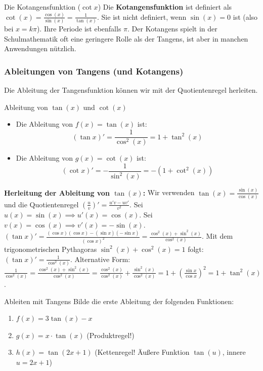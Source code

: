 \begin{infoboxumgebung}{Die Kotangensfunktion ($\cot x$)}
Die \textbf{Kotangensfunktion} ist definiert als $\cot(x) = \frac{\cos(x)}{\sin(x)} = \frac{1}{\tan(x)}$.
Sie ist nicht definiert, wenn $\sin(x)=0$ ist (also bei $x=k\pi$). Ihre Periode ist ebenfalls $\pi$.
Der Kotangens spielt in der Schulmathematik oft eine geringere Rolle als der Tangens, ist aber in manchen Anwendungen nützlich.
\end{infoboxumgebung}

\subsubsection{Ableitungen von Tangens (und Kotangens)}
Die Ableitung der Tangensfunktion können wir mit der Quotientenregel herleiten.

\begin{merksatzumgebung}{Ableitung von $\tan(x)$ und $\cot(x)$}
\begin{itemize}
    \item Die Ableitung von $f(x) = \tan(x)$ ist:
    \[ (\tan x)' = \frac{1}{\cos^2(x)} = 1 + \tan^2(x) \]
    \item Die Ableitung von $g(x) = \cot(x)$ ist:
    \[ (\cot x)' = -\frac{1}{\sin^2(x)} = -(1 + \cot^2(x)) \]
\end{itemize}
\end{merksatzumgebung}

\textbf{Herleitung der Ableitung von $\tan(x)$:}
Wir verwenden $\tan(x) = \frac{\sin(x)}{\cos(x)}$ und die Quotientenregel $(\frac{u}{v})' = \frac{u'v - uv'}{v^2}$.
Sei $u(x) = \sin(x) \implies u'(x) = \cos(x)$.
Sei $v(x) = \cos(x) \implies v'(x) = -\sin(x)$.
$(\tan x)' = \frac{(\cos x)(\cos x) - (\sin x)(-\sin x)}{(\cos x)^2} = \frac{\cos^2(x) + \sin^2(x)}{\cos^2(x)}$.
Mit dem trigonometrischen Pythagoras $\sin^2(x) + \cos^2(x) = 1$ folgt:
$(\tan x)' = \frac{1}{\cos^2(x)}$.
Alternative Form: $\frac{1}{\cos^2(x)} = \frac{\cos^2(x) + \sin^2(x)}{\cos^2(x)} = \frac{\cos^2(x)}{\cos^2(x)} + \frac{\sin^2(x)}{\cos^2(x)} = 1 + \left(\frac{\sin x}{\cos x}\right)^2 = 1 + \tan^2(x)$.

\begin{aufgabenumgebung}{Ableiten mit Tangens}
Bilde die erste Ableitung der folgenden Funktionen:
\begin{enumerate}
    \item $f(x) = 3\tan(x) - x$
    \item $g(x) = x \cdot \tan(x)$ (Produktregel!)
    \item $h(x) = \tan(2x+1)$ (Kettenregel! Äußere Funktion $\tan(u)$, innere $u=2x+1$)
\end{enumerate}
\end{aufgabenumgebung}

